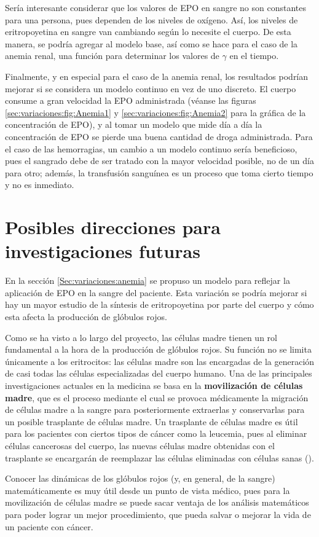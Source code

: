 Sería interesante considerar que los valores de EPO en sangre no son constantes para una persona, pues dependen de los niveles de oxígeno. Así, los niveles de eritropoyetina en sangre van cambiando según lo necesite el cuerpo. De esta manera, se podría agregar al modelo base, así como se hace para el caso de la anemia renal, una función para determinar los valores de $\gamma$ en el tiempo.

Finalmente, y en especial para el caso de la anemia renal, los resultados podrían mejorar si se considera un modelo continuo en vez de uno discreto. El cuerpo consume a gran velocidad la EPO administrada (véanse las figuras \ref{sec:variaciones:fig:Anemia1} y \ref{sec:variaciones:fig:Anemia2} para la gráfica de la concentración de EPO), y al tomar un modelo que mide día a día la concentración de EPO se pierde una buena cantidad de droga administrada. Para el caso de las hemorragias, un cambio a un modelo continuo sería beneficioso, pues el sangrado debe de ser tratado con la mayor velocidad posible, no de un día para otro; además, la transfusión sanguínea es un proceso que toma cierto tiempo y no es inmediato. 

\section{Posibles direcciones para investigaciones futuras}

En la sección \ref{Sec:variaciones:anemia} se propuso un modelo para reflejar la aplicación de EPO en la sangre del paciente. Esta variación se podría mejorar si hay un mayor estudio de la síntesis de eritropoyetina por parte del cuerpo y cómo esta afecta la producción de glóbulos rojos.

Como se ha visto a lo largo del proyecto, las células madre tienen un rol fundamental a la hora de la producción de glóbulos rojos. Su función no se limita únicamente a los eritrocitos: las células madre son las encargadas de la generación de casi todas las células especializadas del cuerpo humano. Una de las principales investigaciones actuales en la medicina se basa en la \textbf{movilización de células madre}, que es el proceso mediante el cual se provoca médicamente la migración de células madre a la sangre para posteriormente extraerlas y conservarlas para un posible trasplante de células madre. Un trasplante de células madre es útil para los pacientes con ciertos tipos de cáncer como la leucemia, pues al eliminar células cancerosas del cuerpo, las nuevas células madre obtenidas con el trasplante se encargarán de reemplazar las células eliminadas con células sanas (\cite{Trasplante}).  

Conocer las dinámicas de los glóbulos rojos (y, en general, de la sangre) matemáticamente es muy útil desde un punto de vista médico, pues para la movilización de células madre se puede sacar ventaja de los análisis matemáticos para poder lograr un mejor procedimiento, que pueda salvar o mejorar la vida de un paciente con cáncer.
